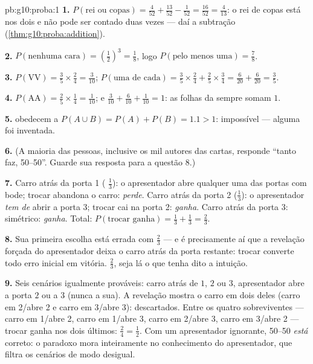 \begin{solution}{pb:g10:proba:1}
\textbf{1.} $P(\text{rei ou copas}) = \frac{4}{52} +
\frac{13}{52} - \frac{1}{52} = \frac{16}{52} = \frac{4}{13}$: o
rei de copas está nos dois  e não pode ser contado duas
vezes --- daí a subtração
(\cref{thm:g10:proba:addition}).

\textbf{2.} $P(\text{nenhuma cara}) = \left(\frac12\right)^3 =
\frac18$, logo $P(\text{pelo menos uma}) = \frac78$.

\textbf{3.} $P(\text{VV}) = \frac35 \times \frac24 =
\frac{3}{10}$; $P(\text{uma de cada}) = \frac35 \times \frac24 +
\frac25 \times \frac34 = \frac{6}{20} + \frac{6}{20} =
\frac35$.

\textbf{4.} $P(\text{AA}) = \frac25 \times \frac14 =
\frac1{10}$; e $\frac{3}{10} + \frac{6}{10} + \frac{1}{10} = 1$:
as folhas da  sempre somam $1$.

\textbf{5.}   obedecem a
$P(A \cup B) = P(A) + P(B) = 1.1 > 1$: impossível --- alguma
 foi inventada.

\textbf{6.} (A maioria das pessoas, inclusive os mil autores das
cartas, responde ``tanto faz, 50--50''. Guarde sua resposta
para a questão 8.)

\textbf{7.} Carro atrás da porta 1 ( $\frac13$): o
apresentador abre qualquer uma das portas com bode; trocar
abandona o carro: \emph{perde}. Carro atrás da porta 2
($\frac13$): o apresentador \emph{tem de} abrir a porta 3;
trocar cai na porta 2: \emph{ganha}. Carro atrás da porta 3:
simétrico: \emph{ganha}. Total:
$P(\text{trocar ganha}) = \frac13 + \frac13 = \frac23$.

\textbf{8.} Sua primeira escolha está errada com 
$\frac23$ --- e é precisamente aí que a revelação forçada do
apresentador deixa o carro atrás da porta restante: trocar
converte todo erro inicial em vitória. $\frac23$, seja lá o que
tenha dito a intuição.

\textbf{9.} Seis cenários igualmente prováveis: carro atrás de
$1$, $2$ ou $3$, apresentador abre a porta $2$ ou a $3$ (nunca
a sua). A revelação mostra o carro em dois deles
(carro em 2/abre 2 e carro em 3/abre 3): descartados. Entre os
quatro sobreviventes --- carro em 1/abre 2, carro em 1/abre 3,
carro em 2/abre 3, carro em 3/abre 2 --- trocar ganha nos dois
últimos: $\frac24 = \frac12$. Com um apresentador ignorante,
50--50 \emph{está} correto: o paradoxo mora inteiramente no
conhecimento do apresentador, que filtra os cenários de modo
desigual.


\end{solution}
